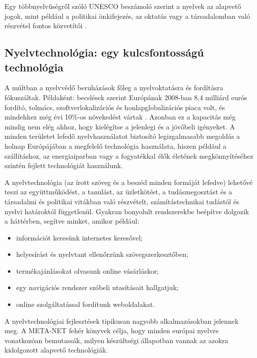 \begin{multicols}{2}

Egy többnyelvűségről szóló UNESCO beszámoló szerint a nyelvek az alapvető jogok, mint például a politikai önkifejezés, az oktatás vagy a társadalomban való részvétel fontos közvetítői \cite{Unesco1}.

\subsection{Nyelvtechnológia: egy kulcsfontosságú technológia}

A múltban a nyelvvédő beruházások főleg a nyelvoktatásra és fordításra fókuszáltak. Példaként: becslések szerint Európának 2008-ban 8,4 milliárd eurós fordító, tolmács, szoftverlokalizációs és honlapglobalizációs piaca volt, és mindehhez még évi 10\%-os növekedést vártak \cite{EC3}. Azonban ez a kapacitás még mindig nem elég ahhoz, hogy kielégítse a jelenlegi és a jövőbeli igényeket. A minden területet lefedő nyelvhasználatot biztosító legizgalmasabb megoldás a holnap Európájában a megfelelő technológia használata, hiszen például a szállításhoz, az energiaiparban vagy a fogyatékkal élők életének megkönnyítéséhez szintén fejlett technológiát használunk.

A nyelvtechnológia (az írott szöveg és a beszéd minden formáját lefedve) lehetővé teszi az együttműködést, a tanulást, az üzletkötést, a tudásmegosztást és a társadalmi és politikai vitákban való rész\-vé\-telt, számítástechnikai tudástól és nyelvi határoktól függetlenül. Gyakran bo\-nyo\-lult rendszerekbe beépítve dolgozik a háttérben, segítve minket, amikor például:

\begin{itemize}
\item információt keresünk internetes ke\-re\-ső\-vel;
\item helyesírást és nyelvtant ellenőrzünk szövegszerkesztőben;
\item termékajánlásokat olvasunk online vásárláskor;
\item egy navigációs rendszer szóbeli uta\-sí\-tá\-sait hallgatjuk;
\item online szolgáltatással fordítunk web\-oldalakat.
\end{itemize}

A nyelvtechnológiai fejlesztések tipikusan nagyobb alkalmazásokban jelennek meg. A META-NET fehér könyvek célja, hogy minden európai nyelvre vonatkozóan bemutassák, milyen készültségi állapotban vannak az azokra kidolgozott alapvető technológiák.


\end{multicols}
